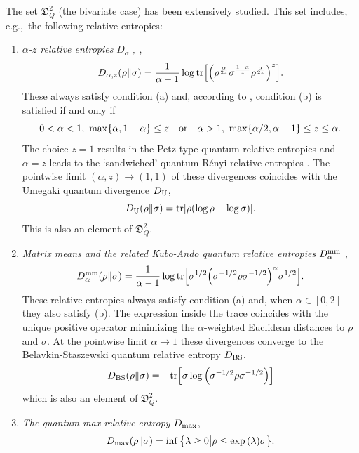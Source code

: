 \documentclass[12pt,a4paper,reqno]{amsart}
\theoremstyle{definition}
\newcommand{\mf}[1]{\mathfrak{#1}}
\newcommand{\tr}[1]{\mathrm{tr}\left[#1\right]} %
\let\originalleft\left
\let\originalright\right
\renewcommand{\left}{\mathopen{}\mathclose\bgroup\originalleft}
\renewcommand{\right}{\aftergroup\egroup\originalright}
\begin{document}
The set $\mf D_Q^2$ (the bivariate case) has been extensively studied. This set includes, e.g.,\ the following relative entropies:
\begin{enumerate}
\item {\it $\alpha$-$z$ relative entropies} $D_{\alpha,z}$ \cite{Audenaert_Datta_2015,Hiai_Jencova_2024,Jaksic2012},
\begin{equation}\label{eq:alphazed}
D_{\alpha,z}(\rho\|\sigma)=\frac{1}{\alpha-1}\log{\tr{\left(\rho^{\frac{\alpha}{2z}}\sigma^{\frac{1-\alpha}{z}}\rho^{\frac{\alpha}{2z}}\right)^z}}.
\end{equation}
These always satisfy condition (a) and, according to \cite{Carlen_et_al_2018,Hiai2013,Zhang2020}, condition (b) is satisfied if and only if
\begin{equation}\label{eq:alphazedcond}
0<\alpha<1,\ \max\{\alpha,1-\alpha\}\leq z\quad{\rm or}\quad\alpha>1,\ \max\{\alpha/2,\alpha-1\}\leq z\leq\alpha.
\end{equation}
The choice $z=1$ results in the Petz-type quantum relative entropies \cite{Petz_85,Petz_1986} and $\alpha=z$ leads to the `sandwiched' quantum R\'{e}nyi relative entropies \cite{Muller-Lennert_et_al_2013}. The pointwise limit $(\alpha,z)\to(1,1)$ of these divergences coincides with the Umegaki quantum divergence $D_{\rm U}$,
\begin{equation}\label{eq:Umegaki}
D_{\rm U}(\rho\|\sigma)=\tr{\rho(\log{\rho}-\log{\sigma})}.
\end{equation}
This is also an element of $\mf D_Q^2$.
\item {\it Matrix means and the related Kubo-Ando quantum relative entropies} $D^{\rm mm}_\alpha$ \cite{Belavkin_Staszewski_82,Kubo_Ando_79},
\begin{equation}\label{eq:KuboAndo}
D^{\rm mm}_\alpha(\rho\|\sigma)=\frac{1}{\alpha-1}\log{\tr{\sigma^{1/2}\left(\sigma^{-1/2}\rho\sigma^{-1/2}\right)^\alpha\sigma^{1/2}}}.
\end{equation}
These relative entropies always satisfy condition (a) and, when $\alpha\in[0,2]$ they also satisfy (b). The expression inside the trace coincides with the unique positive operator minimizing the $\alpha$-weighted Euclidean distances to $\rho$ and $\sigma$. At the pointwise limit $\alpha\to 1$ these divergences converge to the Belavkin-Staszewski quantum relative entropy $D_{\rm BS}$,
\begin{equation}\label{eq:BS}
D_{\rm BS}(\rho\|\sigma)=-\tr{\sigma\log{\left(\sigma^{-1/2}\rho\sigma^{-1/2}\right)}}
\end{equation}
which is also an element of $\mf D_Q^2$.
\item {\it The quantum max-relative entropy} $D_{\rm max}$,
\begin{equation}\label{eq:maxdiv}
D_{\rm max}(\rho\|\sigma)=\inf\big\{\lambda\geq0\big|\rho\leq\exp{(\lambda)}\sigma\big\}.
\end{equation}
\end{enumerate}
\end{document}
